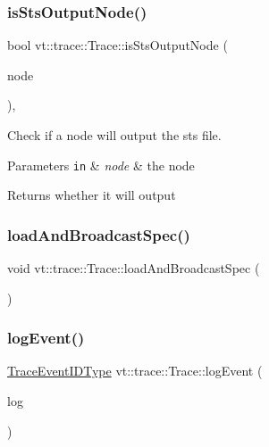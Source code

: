 \subsubsection{\texorpdfstring{is\+Sts\+Output\+Node()}{isStsOutputNode()}}
{\footnotesize\ttfamily bool vt\+::trace\+::\+Trace\+::is\+Sts\+Output\+Node (\begin{DoxyParamCaption}\item[{\hyperlink{namespacevt_a866da9d0efc19c0a1ce79e9e492f47e2}{Node\+Type}}]{node }\end{DoxyParamCaption})\hspace{0.3cm}{\ttfamily [static]}, {\ttfamily [private]}}



Check if a node will output the sts file. 


\begin{DoxyParams}[1]{Parameters}
\mbox{\tt in}  & {\em node} & the node\\
\hline
\end{DoxyParams}
\begin{DoxyReturn}{Returns}
whether it will output 
\end{DoxyReturn}
\mbox{\label{structvt_1_1trace_1_1_trace_a06f74f8d2c0c2fb97be14a264fd36a45}} 
\subsubsection{\texorpdfstring{load\+And\+Broadcast\+Spec()}{loadAndBroadcastSpec()}}
{\footnotesize\ttfamily void vt\+::trace\+::\+Trace\+::load\+And\+Broadcast\+Spec (\begin{DoxyParamCaption}{ }\end{DoxyParamCaption})}

\mbox{\label{structvt_1_1trace_1_1_trace_add92bd2da3d78dd7ad2f1112583c4596}} 
\subsubsection{\texorpdfstring{log\+Event()}{logEvent()}}
{\footnotesize\ttfamily \hyperlink{namespacevt_1_1trace_a64a7185f3e102df8d8258f263ccd1582}{Trace\+Event\+I\+D\+Type} vt\+::trace\+::\+Trace\+::log\+Event (\begin{DoxyParamCaption}\item[{\hyperlink{structvt_1_1trace_1_1_trace_a43306d96a91e49db081eaea016f1dd0a}{Log\+Type} \&\&}]{log }\end{DoxyParamCaption})\hspace{0.3cm}{\ttfamily [private]}}



